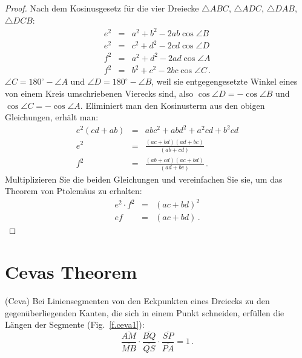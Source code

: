 \begin{proof}
Nach dem Kosinusgesetz für die vier Dreiecke $\triangle ABC$, $\triangle ADC$, $\triangle DAB$, $\triangle DCB$:
\begin{eqnarray*}
e^2 &=& a^2 + b^2 - 2ab \cos \angle B\\
e^2 &=& c^2 + d^2 - 2cd \cos \angle D\\
f^2 &=& a^2 + d^2 - 2ad \cos \angle A\\
f^2 &=& b^2 + c^2 - 2bc \cos \angle C\,.
\end{eqnarray*}
$\angle C = 180^\circ - \angle A$ und $\angle D = 180^\circ - \angle B$, weil sie entgegengesetzte Winkel eines von einem Kreis umschriebenen Vierecks sind, also $\cos \angle D = - \cos \angle B$ und $\cos \angle C = -\cos \angle A$. Eliminiert man den Kosinusterm aus den obigen Gleichungen, erhält man:
\begin{eqnarray*}
e^2(cd+ab)&=&abc^2+abd^2+a^2cd+b^2cd\\
e^2 &=& \frac{(ac+bd)(ad+bc)}{(ab+cd)}\\
f^2 &=& \frac{(ab+cd)(ac+bd)}{(ad+bc)}\,.
\end{eqnarray*}
Multiplizieren Sie die beiden Gleichungen und vereinfachen Sie sie, um das Theorem von Ptolemäus zu erhalten:
\begin{eqnarray*}
e^2\cdot f^2 &=& (ac+bd)^2\\
ef &=& (ac+bd)\,.
\end{eqnarray*}
\end{proof}


\section{Cevas Theorem}\label{a.ceva}


\begin{theorem}(Ceva)
Bei Liniensegmenten von den Eckpunkten eines Dreiecks zu den gegenüberliegenden Kanten, die sich in einem Punkt schneiden, erfüllen die Längen der Segmente (Fig.~\ref{f.ceva1}):\label{thm.ceva}
\[
\frac{\overline{AM}}{\overline{MB}}\cdot\frac{\overline{BQ}}{\overline{QS}}\cdot\frac{\overline{SP}}{\overline{PA}} = 1\,.
\]
\end{theorem}

